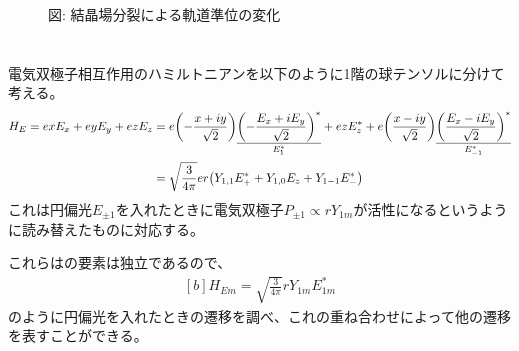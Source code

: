 \documentclass[../ap_2011.tex]{subfiles}
\begin{document}
\begin{figure}[h]
    \caption*{図: 結晶場分裂による軌道準位の変化}
\end{figure}

\section{}
電気双極子相互作用のハミルトニアンを以下のように1階の球テンソルに分けて考える。
\begin{equation}\begin{aligned}[b]
    H_E = exE_x+eyE_y+ezE_z
    &= e\qty(-\frac{x+iy}{\sqrt{2}})\underset{E_1^*}{\underline{\qty(-\frac{E_x+iE_y}{\sqrt{2}})^*}}
    +ezE_z^*
    +e\qty(\frac{x-iy}{\sqrt{2}})\underset{E_{-1}^*}{\underline{\qty(\frac{E_x-iE_y}{\sqrt{2}})^*}}\\
    &=\sqrt{\frac{3}{4\pi}}er\qty(Y_{1,1}E_+^* +Y_{1,0}E_z +Y_{1-1}E_-^*)
\end{aligned}\end{equation}
これは円偏光\(E_{\pm1}\)を入れたときに電気双極子\(P_{\pm 1}\propto rY_{1m}\)が活性になるというように読み替えたものに対応する。

これらはの要素は独立であるので、
\begin{equation}\begin{aligned}[b]
    H_{Em} = \sqrt{\frac{3}{4\pi}}r Y_{1m}E_{1m}^*
\end{aligned}\end{equation}
のように円偏光を入れたときの遷移を調べ、これの重ね合わせによって他の遷移を表すことができる。
\end{document}
